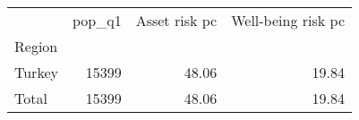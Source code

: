 \begin{tabular}{lrrr}
\toprule
{} &  pop\_q1 &  Asset risk pc &  Well-being risk pc \\
Region &         &                &                     \\
\midrule
Turkey &   15399 &          48.06 &               19.84 \\
Total  &   15399 &          48.06 &               19.84 \\
\bottomrule
\end{tabular}

